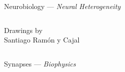 \documentclass[aspectratio=169]{beamer}
\renewcommand{\emph}[1]{{\color{violet}\textit{#1}}}
\begin{document}
\begin{frame}{Neurobiology --- \emph{Neural Heterogeneity}}
\begin{columns}
			\vspace{-0.75cm}\begin{minipage}{6cm}{\raggedleft\footnotesize Drawings by\\Santiago Ramón y Cajal\\}\end{minipage}
	\end{columns}
\end{frame}


\begin{frame}{Synapses --- \emph{Biophysics}}
    
\end{frame}
\end{document}

